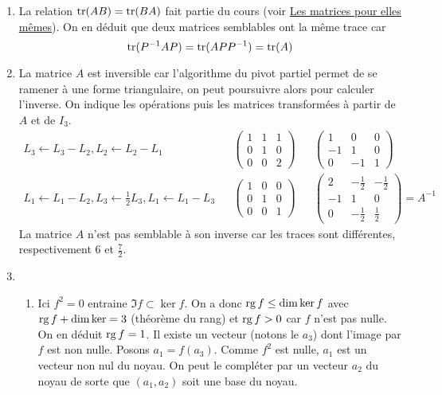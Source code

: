 \begin{enumerate}
 \item La relation $\operatorname{tr}(AB)=\operatorname{tr}(BA)$ fait partie du cours (voir \href{http://back.maquisdoc.net/data/cours_nicolair/C2232.pdf}{Les matrices pour elles mêmes}). On en déduit que deux matrices semblables ont la même trace car
\begin{displaymath}
 \operatorname{tr}(P^{-1}AP)=\operatorname{tr}(APP^{-1})=\operatorname{tr}(A)
\end{displaymath}

 \item La matrice $A$ est inversible car l'algorithme du pivot partiel permet de se ramener à une forme triangulaire, on peut poursuivre alors pour calculer l'inverse. On indique les opérations puis les matrices transformées à partir de $A$ et de $I_3$.
\begin{align*}
 L_3\leftarrow L_3-L_2, L_2\leftarrow L_2-L_1 &  &
\begin{pmatrix}
 1&1&1\\0&1&0\\0&0&2
\end{pmatrix}
& &
\begin{pmatrix}
 1&0&0\\-1&1&0\\0&-1&1
\end{pmatrix}
\\
L_1\leftarrow L_1-L_2, L_3\leftarrow \frac{1}{2}L_3, L_1\leftarrow L_1 -L_3 &  &
\begin{pmatrix}
 1&0&0\\0&1&0\\0&0&1
\end{pmatrix}
& &
\begin{pmatrix}
 2&-\frac{1}{2}&-\frac{1}{2}\\-1&1&0\\0&-\frac{1}{2}&\frac{1}{2}
\end{pmatrix}=A^{-1}
\end{align*}
La matrice $A$ n'est pas semblable à son inverse car les traces sont différentes, respectivement $6$ et $\frac{7}{2}$.
 \item 
\begin{enumerate}
 \item Ici $f^2=0$ entraine $\Im f \subset \ker f$. On a donc $\operatorname{rg} f \leq \dim \ker f$ avec $\operatorname{rg} f + \dim \ker =3$ (théorème du rang) et $\operatorname{rg} f>0$ car $f$ n'est pas nulle. On en déduit $\operatorname{rg} f=1$.\newline
Il existe un vecteur (notons le $a_3$) dont l'image par $f$ est non nulle. Posons $a_1=f(a_3)$. Comme $f^2$ est nulle, $a_1$ est un vecteur non nul du noyau. On peut le compléter par un vecteur $a_2$ du noyau de sorte que $(a_1,a_2)$ soit une base du noyau.\newline

\end{enumerate}
\end{enumerate}
